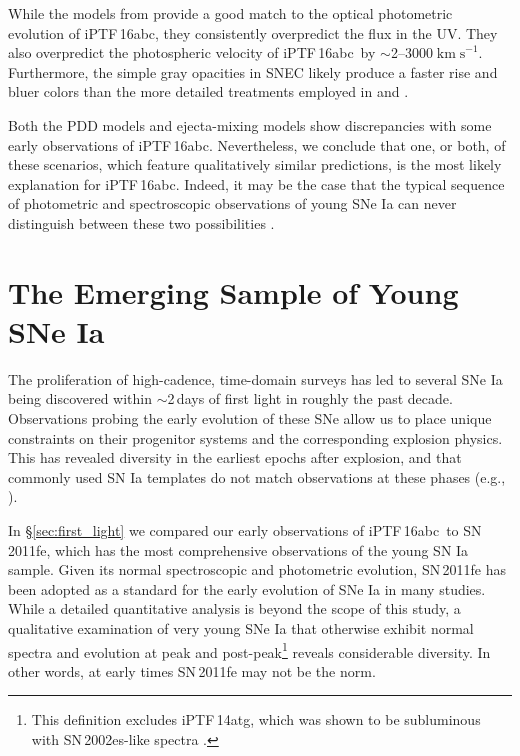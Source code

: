 \documentclass[twocolumn]{aastex61}
\newcommand{\abc}{iPTF\,16abc}
\newcommand{\sneia}{SNe Ia}
\begin{document}
While the models from \citet{2016ApJ...826...96P} provide a good match to
the optical photometric evolution of \abc, they consistently overpredict the
flux in the UV. They also overpredict the photospheric velocity of \abc\ by
$\sim$2--3000$\; \mathrm{km \; s}^{-1}$. Furthermore, the simple gray
opacities in SNEC likely produce a faster rise and bluer colors than the
more detailed treatments employed in \citet{2014MNRAS.441..532D} and
\citet{2017MNRAS.472.2787N}.

Both the PDD models and ejecta-mixing models show discrepancies with some
early observations of \abc. Nevertheless, we conclude that one, or both, of
these scenarios, which feature qualitatively similar predictions, is the
most likely explanation for \abc. Indeed, it may be the case that the
typical sequence of photometric and spectroscopic observations of young SNe
Ia can never distinguish between these two possibilities
\citep{2017MNRAS.472.2787N}.

\section{The Emerging Sample of Young \sneia}

The proliferation of high-cadence, time-domain surveys has led to several
SNe Ia being discovered within $\sim$2\,days of first light in roughly the
past decade. Observations probing the early evolution of these SNe allow us
to place unique constraints on their progenitor systems and the
corresponding explosion physics. This has revealed diversity in the earliest
epochs after explosion, and that commonly used SN Ia templates do not match
observations at these phases (e.g., \citealt{2012ApJ...744...38F}).

In \S\ref{sec:first_light} we compared our early observations of \abc\ to
SN\,2011fe, which has the most comprehensive observations of the young SN Ia
sample. Given its normal spectroscopic and photometric evolution, SN\,2011fe
has been adopted as a standard for the early evolution of SNe Ia in many
studies. While a detailed quantitative analysis is beyond the scope of this
study, a qualitative examination of very young SNe Ia that otherwise exhibit
normal spectra and evolution at peak and post-peak\footnote{This definition
excludes iPTF\,14atg, which was shown to be subluminous with SN\,2002es-like
spectra \citep{2015Natur.521..328C}.} reveals considerable diversity. In
other words, at early times SN\,2011fe may not be the norm.
\end{document}
